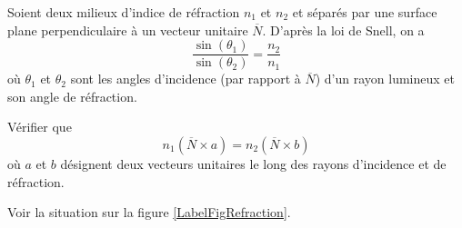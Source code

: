 
\begin{exercice}\label{exoOutilsMath-0076}

    Soient deux milieux d'indice de réfraction $n_1$ et $n_2$ et séparés par une surface plane perpendiculaire à un vecteur unitaire $\overline{ N }$. D'après la loi de Snell, on a 
    \begin{equation}
        \frac{ \sin(\theta_1) }{ \sin(\theta_2) }=\frac{ n_2 }{ n_1 }
    \end{equation}
    où $\theta_1$ et $\theta_2$ sont les angles d'incidence (par rapport à $\overline{ N }$) d'un rayon lumineux et son angle de réfraction.

    Vérifier que
    \begin{equation}
        n_1(\overline{ N }\times a)=n_2(\overline{ N }\times b)
    \end{equation}
    où $a$ et $b$ désignent deux vecteurs unitaires le long des rayons d'incidence et de réfraction.


    Voir la situation sur la figure \ref{LabelFigRefraction}.
\newcommand{\CaptionFigRefraction}{Angles de réfraction et de réflexion.}


\end{exercice}
